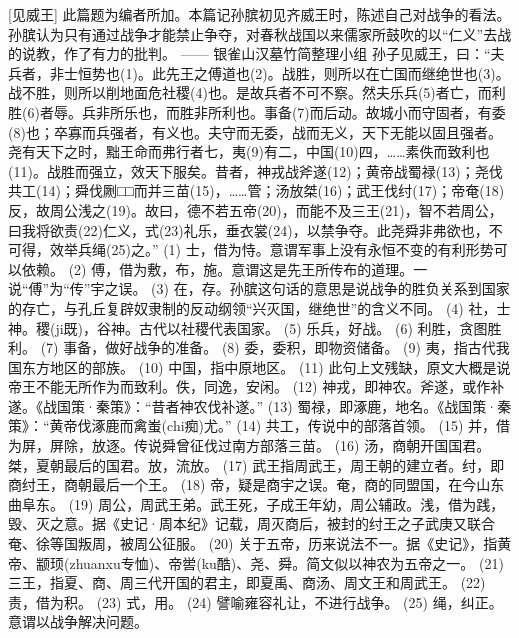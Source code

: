 \documentclass[12pt,UTF8]{ctexbook}
\begin{document}
[见威王]
此篇题为编者所加。本篇记孙膑初见齐威王时，陈述自己对战争的看法。孙膑认为只有通过战争才能禁止争夺，对春秋战国以来儒家所鼓吹的以“仁义”去战的说教，作了有力的批判。
—— 银雀山汉墓竹简整理小组
孙子见威王，曰：“夫兵者，非士恒势也(1)。此先王之傅道也(2)。战胜，则所以在亡国而继绝世也(3)。战不胜，则所以削地面危社稷(4)也。是故兵者不可不察。然夫乐兵(5)者亡，而利胜(6)者辱。兵非所乐也，而胜非所利也。事备(7)而后动。故城小而守固者，有委(8)也；卒寡而兵强者，有义也。夫守而无委，战而无义，天下无能以固且强者。尧有天下之时，黜王命而弗行者七，夷(9)有二，中国(10)四，……素佚而致利也(11)。战胜而强立，效天下服矣。昔者，神戎战斧遂(12)；黄帝战蜀禄(13)；尧伐共工(14)；舜伐劂□□而并三苗(15)，……管；汤放桀(16)；武王伐纣(17)；帝奄(18)反，故周公浅之(19)。故曰，德不若五帝(20)，而能不及三王(21)，智不若周公，曰我将欲责(22)仁义，式(23)礼乐，垂衣裳(24)，以禁争夺。此尧舜非弗欲也，不可得，效举兵绳(25)之。”
(1) 士，借为恃。意谓军事上没有永恒不变的有利形势可以依赖。
(2) 傅，借为敷，布，施。意谓这是先王所传布的道理。一说“傅”为“传”宇之误。
(3) 在，存。孙膑这句话的意思是说战争的胜负关系到国家的存亡，与孔丘复辟奴隶制的反动纲领“兴灭国，继绝世”的含义不同。
(4) 社，士神。稷(ji既)，谷神。古代以社稷代表国家。
(5) 乐兵，好战。
(6) 利胜，贪图胜利。
(7) 事备，做好战争的准备。
(8) 委，委积，即物资储备。
(9) 夷，指古代我国东方地区的部族。
(10) 中国，指中原地区。
(11) 此句上文残缺，原文大概是说帝王不能无所作为而致利。佚，同逸，安闲。
(12) 神戎，即神农。斧遂，或作补遂。《战国策·秦策》：“昔者神农伐补遂。”
(13) 蜀禄，即涿鹿，地名。《战国策·秦策》：“黄帝伐涿鹿而禽蚩(chi痴)尤。”
(14) 共工，传说中的部落首领。
(15) 并，借为屏，屏除，放逐。传说舜曾征伐过南方部落三苗。
(16) 汤，商朝开国国君。桀，夏朝最后的国君。放，流放。
(17) 武王指周武王，周王朝的建立者。纣，即商纣王，商朝最后一个王。
(18) 帝，疑是商宇之误。奄，商的同盟国，在今山东曲阜东。
(19) 周公，周武王弟。武王死，子成王年幼，周公辅政。浅，借为践，毁、灭之意。据《史记·周本纪》记载，周灭商后，被封的纣王之子武庚又联合奄、徐等国叛周，被周公征服。
(20) 关于五帝，历来说法不一。据《史记》，指黄帝、颛顼(zhuanxu专恤)、帝喾(ku酷)、尧、舜。简文似以神农为五帝之一。
(21) 三王，指夏、商、周三代开国的君主，即夏禹、商汤、周文王和周武王。
(22) 责，借为积。
(23) 式，用。
(24) 譬喻雍容礼让，不进行战争。
(25) 绳，纠正。意谓以战争解决问题。
\end{document}
